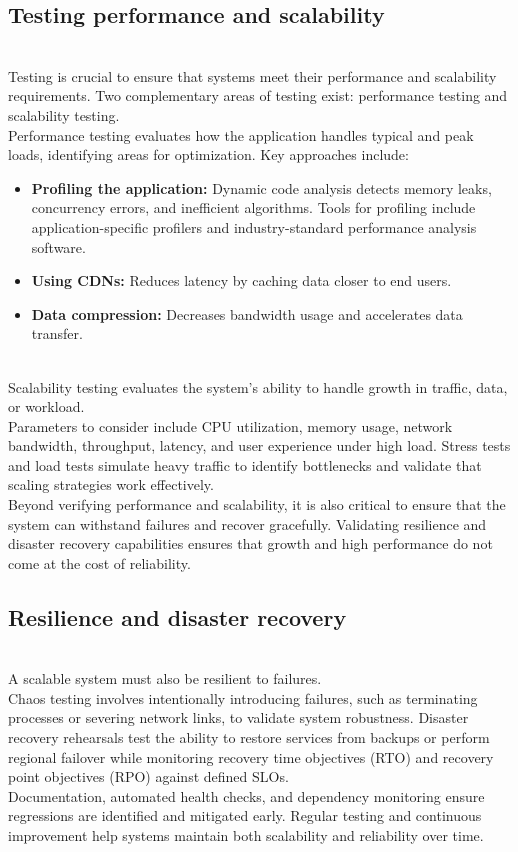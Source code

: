 \subsection{Testing performance and scalability}\label{EqB4mTHbHBX9wWU_eteXK}
\\
Testing is crucial to ensure that systems meet their performance and scalability requirements. Two complementary areas of testing exist: performance testing and scalability testing.
\\
Performance testing evaluates how the application handles typical and peak loads, identifying areas for optimization. Key approaches include:

\begin{itemize}
\item
\protect{}\label{Sm35lOxraUqF8vCUobpz3}
\textbf{Profiling the application:} Dynamic code analysis detects memory leaks, concurrency errors, and inefficient algorithms. Tools for profiling include application-specific profilers and industry-standard performance analysis software.
\item
\protect{}\label{7BOWQSFJntmAB_pEt6vI2}
\textbf{Using CDNs:} Reduces latency by caching data closer to end users.
\item
\protect{}\label{ma3j1YyfC3TfMhpRSYEZy}
\textbf{Data compression:} Decreases bandwidth usage and accelerates data transfer.
\end{itemize}
\\
Scalability testing evaluates the system's ability to handle growth in traffic, data, or workload.
\\
Parameters to consider include CPU utilization, memory usage, network bandwidth, throughput, latency, and user experience under high load. Stress tests and load tests simulate heavy traffic to identify bottlenecks and validate that scaling strategies work effectively.
\\
Beyond verifying performance and scalability, it is also critical to ensure that the system can withstand failures and recover gracefully. Validating resilience and disaster recovery capabilities ensures that growth and high performance do not come at the cost of reliability.

\subsection{Resilience and disaster recovery}\label{QYt7JZIOESIsUTuZbiJ5U}
\\
A scalable system must also be resilient to failures.
\\
Chaos testing involves intentionally introducing failures, such as terminating processes or severing network links, to validate system robustness. Disaster recovery rehearsals test the ability to restore services from backups or perform regional failover while monitoring recovery time objectives (RTO) and recovery point objectives (RPO) against defined SLOs.
\\
Documentation, automated health checks, and dependency monitoring ensure regressions are identified and mitigated early. Regular testing and continuous improvement help systems maintain both scalability and reliability over time.


